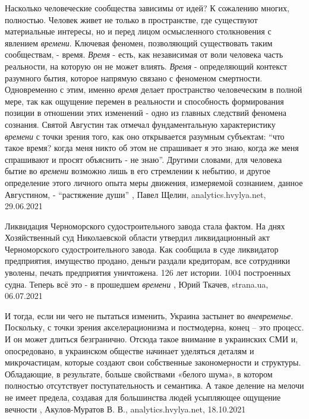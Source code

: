 Насколько человеческие сообщества зависимы от идей? К сожалению многих,
полностью. Человек живет не только в пространстве, где существуют материальные
интересы, но и перед лицом осмысленного столкновения с явлением \emph{времени}.
Ключевая феномен, позволяющий существовать таким сообществам, - время. \emph{Время} -
есть, как независимая от воли человека часть реальности, на которую он не может
влиять. \emph{Время} - определяющий контекст разумного бытия, которое напрямую связано
с феноменом смертности. Одновременно с этим, именно \emph{время} делает пространство
человеческим в полной мере, так как ощущение перемен в реальности и способность
формирования позиции в отношении этих изменений - одно из главных следствий
феномена сознания. Святой Августин так отмечал фундаментальную характеристику
\emph{времени} с точки зрения того, как оно открывается разумным субъектам: \enquote{что такое
время? когда меня никто об этом не спрашивает я это знаю, когда же меня
спрашивают и просят объяснить - не знаю}. Другими словами, для человека бытие
во \emph{времени} возможно лишь в его стремлении к небытию, и другое определение этого
личного опыта меры движения, измеряемой сознанием, данное Августином, -
\enquote{растяжение души}
, Павел Щелин, 
analytics.hvylya.net, 29.06.2021

Ликвидация Черноморского судостроительного завода стала фактом.  На днях
Хозяйственный суд Николаевской области утвердил ликвидационный акт
Черноморского судостроительного завода.  Как сообщила в суде ликвидатор
предприятия, имущество продано, деньги раздали кредиторам, все сотрудники
уволены, печать предприятия уничтожена.  126 лет истории. 1004 построенных
судна. Теперь всё это - в прошедшем \emph{времени}
, 
Юрий Ткачев, strana.ua, 06.07.2021

И тогда, если ни чего не пытаться изменить, Украина застынет во \emph{вневременье}.
Поскольку, с точки зрения акселерационизма и постмодерна, конец – это процесс.
И он может длиться безгранично. Отсюда такое внимание в украинских СМИ и,
опосредовано, в украинском обществе начинает уделяться деталям и микрочастицам,
которые создают свои собственные закономерности и структуры. Обладающие, в
результате, больше свойствами «белого шума», в котором полностью отсутствует
поступательность и семантика. А такое деление на мелочи не имеет предела,
создавая для большинства людей усыпляющее ощущение вечности
, 
Акулов-Муратов В. В., analytics.hvylya.net, 18.10.2021
